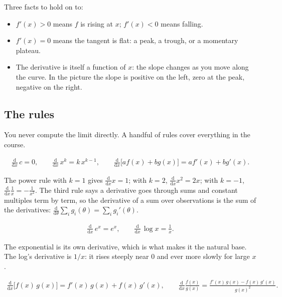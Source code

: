 \documentclass[11pt]{article}
\theoremstyle{definition}
\newcommand{\dd}{\mathrm{d}}
\begin{document}
Three facts to hold on to:
\begin{itemize}
  \item $f'(x) > 0$ means $f$ is rising at $x$; $f'(x) < 0$ means falling.
  \item $f'(x) = 0$ means the tangent is flat: a peak, a trough, or a
        momentary plateau.
  \item The derivative is itself a function of $x$: the slope changes as
        you move along the curve. In the picture the slope is positive on
        the left, zero at the peak, negative on the right.
\end{itemize}

\subsection{The rules}

You never compute the limit directly. A handful of rules cover everything
in the course.

\begin{rulebox}
\begin{align*}
  \frac{\dd}{\dd x}\, c = 0, \qquad
  \frac{\dd}{\dd x}\, x^{k} = k\,x^{k-1}, \qquad
  \frac{\dd}{\dd x}\big[a f(x) + b g(x)\big] = a f'(x) + b g'(x).
\end{align*}
\end{rulebox}

The power rule with $k = 1$ gives $\frac{\dd}{\dd x}x = 1$; with $k = 2$,
$\frac{\dd}{\dd x}x^2 = 2x$; with $k = -1$, $\frac{\dd}{\dd x}\frac1x =
-\frac{1}{x^2}$. The third rule says a derivative goes through sums and
constant multiples term by term, so the derivative of a sum over
observations is the sum of the derivatives:
$\frac{\dd}{\dd\theta}\sum_i g_i(\theta) = \sum_i g_i'(\theta)$.

\begin{rulebox}
\begin{align*}
  \frac{\dd}{\dd x}\, e^{x} = e^{x}, \qquad
  \frac{\dd}{\dd x}\, \log x = \frac{1}{x} .
\end{align*}
\end{rulebox}

The exponential is its own derivative, which is what makes it the natural
base. The log's derivative is $1/x$: it rises steeply near $0$ and ever
more slowly for large $x$.

\begin{rulebox}
\begin{align*}
  \frac{\dd}{\dd x}\big[f(x)\,g(x)\big] = f'(x)\,g(x) + f(x)\,g'(x),
  \qquad
  \frac{\dd}{\dd x}\frac{f(x)}{g(x)} = \frac{f'(x)\,g(x) - f(x)\,g'(x)}{g(x)^2}.
\end{align*}
\end{rulebox}
\end{document}
